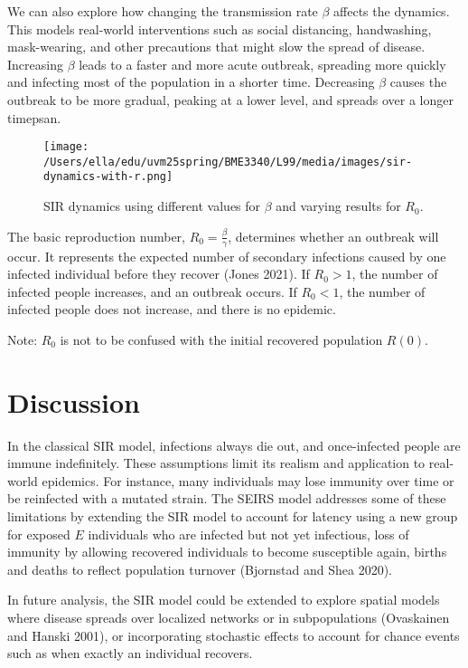 \documentclass[12pt]{article}
\begin{document}
We can also explore how changing the transmission rate \(\beta\) affects the dynamics. This models real-world interventions such as social distancing, handwashing, mask-wearing, and other precautions that might slow the spread of disease. Increasing \(\beta\) leads to a faster and more acute outbreak, spreading more quickly and infecting most of the population in a shorter time. Decreasing \(\beta\) causes the outbreak to be more gradual, peaking at a lower level, and spreads over a longer timepsan.

\begin{figure}[h!]
        \centering
        \texttt{[image: /Users/ella/edu/uvm25spring/BME3340/L99/media/images/sir-dynamics-with-r.png]}
        \caption{SIR dynamics using different values for \(\beta\) and varying results for \(R_0\).}
        \label{fig:cg}
\end{figure}

The basic reproduction number, \( R_0 = \frac{\beta}{\gamma}\), determines whether an outbreak will occur. It represents the expected number of secondary infections caused by one infected individual before they recover (Jones 2021). If \(R_0 > 1\), the number of infected people increases, and an outbreak occurs. If \(R_0 < 1\), the number of infected people does not increase, and there is no epidemic.

Note: \(R_0\) is not to be confused with the initial recovered population \(R(0)\).

\newpage
\section*{Discussion}

In the classical SIR model, infections always die out, and once-infected people are immune indefinitely. These assumptions limit its realism and application to real-world epidemics. For instance, many individuals may lose immunity over time or be reinfected with a mutated strain.  The SEIRS model addresses some of these limitations by extending the SIR model to account for latency using a new group for exposed \(E\) individuals who are infected but not yet infectious, loss of immunity by allowing recovered individuals to become susceptible again, births and deaths to reflect population turnover (Bjornstad and Shea 2020).

In future analysis, the SIR model could be extended to explore spatial models where disease spreads over localized networks or in subpopulations (Ovaskainen and Hanski 2001), or incorporating stochastic effects to account for chance events such as when exactly an individual recovers.
\end{document}
